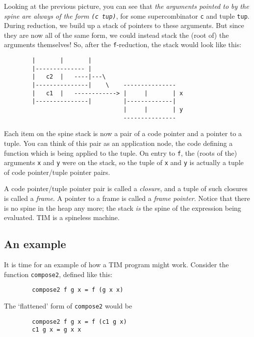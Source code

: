 Looking at the previous picture, you can see that {\em
the arguments pointed to
by the spine are always of the form \mbox{\tt (c\ tup)}}, for some supercombinator
\mbox{\tt c} and tuple \mbox{\tt tup}.
During reduction, we build up a stack of pointers to these arguments.
But since they are now all of the same form, we could instead stack
the (root of) the arguments themselves!  So, after the \mbox{\tt f}-reduction, the
stack would look like this:
\begin{verbatim}
        |       |       |
        |-------------- |
        |   c2  |   ----|---\
        |---------------|    \    ---------------
        |   c1  |   ------------> |     |       | x
        |---------------|         |-------------|
                                  |     |       | y
                                  ---------------
\end{verbatim}
Each item on the spine stack is now
a pair of a code pointer and a pointer to a tuple.
You can think of this pair as an application node, the code defining a function
which is being applied to the tuple.
On entry to \mbox{\tt f}, the (roots of the) arguments \mbox{\tt x} and \mbox{\tt y} were on the stack,
so the tuple of \mbox{\tt x} and \mbox{\tt y} is actually a tuple of code pointer/tuple pointer
pairs.

A code pointer/tuple pointer pair is called a {\em closure},
and a tuple
of such closures is called a {\em frame}.
A pointer to a frame is called
a {\em frame pointer}.
Notice that there is no spine in the heap any more; the stack {\em is\/} the
spine of the expression being evaluated.
TIM is a spineless machine.

\subsection{An example}
\label{sect:tim:compose-eg}

It is time for an example of how a TIM program might work.
Consider the function \mbox{\tt compose2}, defined like this:
\begin{verbatim}
        compose2 f g x = f (g x x)
\end{verbatim}
The `flattened' form of \mbox{\tt compose2} would be
\begin{verbatim}
        compose2 f g x = f (c1 g x)
        c1 g x = g x x
\end{verbatim}

